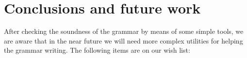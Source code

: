 \documentclass[11pt]{article}
\def\t#1{\texttt{#1}}
\begin{document}




\section{Conclusions and future work}

After checking the soundness of the grammar by means of some simple
tools, we are aware that in the near future we will need more complex
utilities for helping the grammar writing.
The following items are on our wish list:
\end{document}
